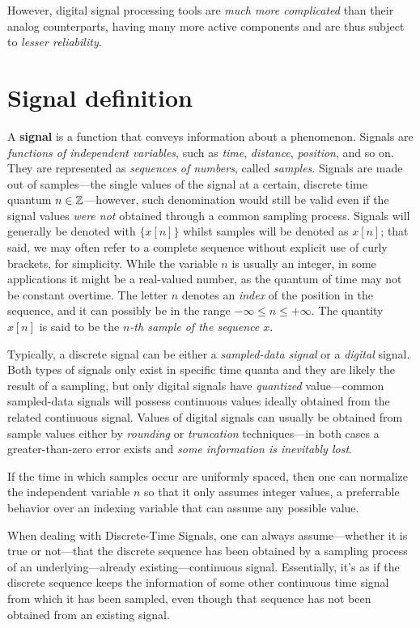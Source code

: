 \documentclass[\documentfontsize, twocolumn]{\classname}
\begin{document}
However, digital signal processing tools are \emph{much more complicated} than their analog counterparts, having many more active components and are thus subject to \emph{lesser reliability}.

\section{Signal definition}

A \textbf{signal} is a function that conveys information about a phenomenon. Signals are \emph{functions of independent variables}, such as \emph{time}, \emph{distance}, \emph{position}, and so on. They are represented as \emph{se\-quen\-ces of numbers}, called \emph{samples}. Signals are made out of samples---the single values of the signal at a certain, discrete time quantum $n \in \mathbb Z$---however, such denomination would still be valid even if the signal values \emph{were not} obtained through a common sampling process. Signals will generally be denoted with $\{x[n]\}$ whilst samples will be denoted as $x[n]$; that said, we may often refer to a complete sequence without explicit use of curly brackets, for simplicity. While the variable $n$ is usually an integer, in some applications it might be a real-valued number, as the quantum of time may not be constant overtime. The letter $n$ denotes an \emph{index} of the position in the sequence, and it can possibly be in the range $-\infty \leq n \leq +\infty$. The quantity $x[n]$ is said to be the \emph{$n$-th sample of the sequence $x$}.

Typically, a discrete signal can be either a \emph{sampled-data signal} or a \emph{digital} signal. Both types of signals only exist in specific time quanta and they are likely the result of a sampling, but only digital signals have \emph{quantized} value---common sampled-data signals will possess continuous values ideally obtained from the related continuous signal. Values of digital signals can usually be obtained from sample values either by \emph{rounding} or \emph{truncation} techniques---in both cases a greater-than-zero error exists and \emph{some information is inevitably lost}.

If the time in which samples occur are uniformly spaced, then one can normalize the independent variable $n$ so that it only assumes integer values, a preferrable behavior over an indexing variable that can assume any possible value.

When dealing with Discrete-Time Signals, one can always assume---whether it is true or not---that the discrete sequence has been obtained by a sampling process of an underlying---already existing---continuous signal. Essentially, it's as if the discrete sequence keeps the information of some other continuous time signal from which it has been sampled, even though that sequence has not been obtained from an existing signal.
\end{document}

